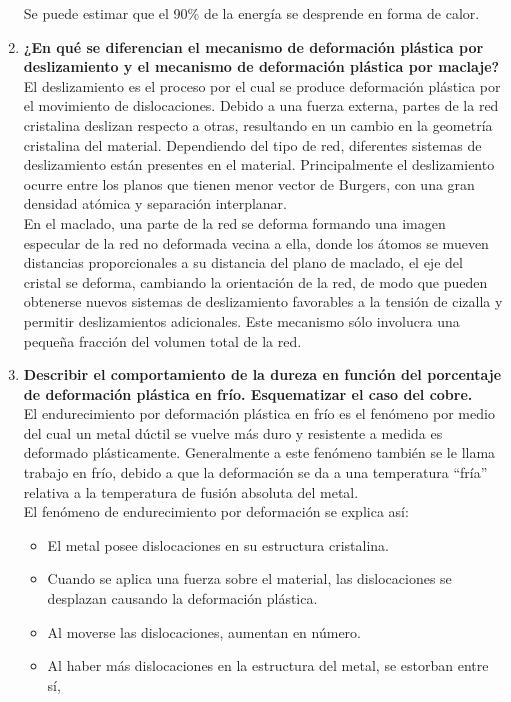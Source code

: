 \documentclass[a4paper,12pt]{report}
\begin{document}
\begin{enumerate}
\begin{itemize}
\end{itemize}
Se puede estimar que el 90\% de la energía se desprende en forma de calor.
\item \textbf{¿En qué se diferencian el mecanismo de deformación plástica por deslizamiento y el mecanismo de deformación plástica por maclaje?}\\
El deslizamiento es el proceso por el cual se produce deformación plástica por el movimiento de dislocaciones. Debido a una fuerza externa, partes de la red cristalina deslizan respecto a otras, resultando en un cambio en la geometría cristalina del material. Dependiendo del tipo de red, diferentes sistemas de deslizamiento están presentes en el material. Principalmente el deslizamiento ocurre entre los planos que tienen menor vector de Burgers, con una gran densidad atómica y separación interplanar.\\
En el maclado, una parte de la red se deforma formando una imagen especular de la red no deformada vecina a ella, donde los átomos se mueven distancias proporcionales a su distancia del plano de maclado, el eje del cristal se deforma, cambiando la orientación de la red, de modo que pueden obtenerse nuevos sistemas de deslizamiento favorables a la tensión de cizalla y permitir deslizamientos adicionales. Este mecanismo sólo involucra una pequeña fracción del volumen total de la red.
\item \textbf{Describir el comportamiento de la dureza en función del porcentaje de deformación plástica en frío. Esquematizar el caso del cobre.}\\
El endurecimiento por deformación plástica en frío es el fenómeno por medio del cual un metal dúctil se vuelve más duro y resistente a medida es deformado plásticamente.  Generalmente a este fenómeno también se le llama trabajo en frío, debido a que la deformación se da a una temperatura “fría” relativa a la temperatura de fusión absoluta del metal. \\
El fenómeno de endurecimiento por deformación se explica así:  
\begin{itemize}
\item El metal posee dislocaciones en su estructura cristalina. 
\item Cuando se aplica una fuerza sobre el material, las dislocaciones se desplazan causando la deformación plástica.
\item Al moverse las dislocaciones, aumentan en número. 
\item Al haber más dislocaciones en la estructura del metal, se estorban entre sí, 

\end{itemize}
\end{enumerate}
\end{document}
